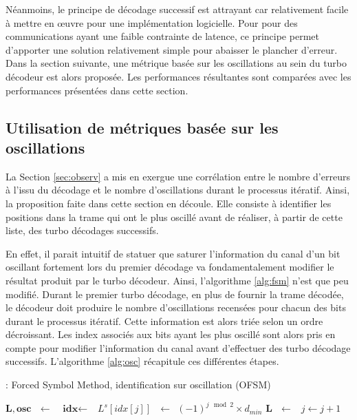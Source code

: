 Néanmoins, le principe de décodage successif est attrayant car relativement facile à mettre en œuvre pour une implémentation logicielle.
Pour pour des communications ayant une faible contrainte de latence, ce principe permet d'apporter une solution relativement
simple pour abaisser le plancher d'erreur. 
Dans la section suivante, une métrique basée sur les oscillations au sein du turbo décodeur est alors proposée. Les performances
résultantes sont comparées avec les performances présentées dans cette section.

\subsection{Utilisation de métriques basée sur les oscillations}
La Section \ref{sec:observ} a mis en exergue une corrélation entre le nombre d'erreurs à l'issu du décodage et 
le nombre d'oscillations durant le processus itératif. Ainsi, la proposition faite dans cette section en découle. Elle 
consiste à identifier les positions dans la trame qui ont le plus oscillé avant de réaliser, à partir de cette liste, des turbo décodages successifs.

En effet, il parait intuitif de statuer que saturer l'information du canal d'un bit oscillant fortement lors du 
premier décodage va fondamentalement modifier le résultat produit par le turbo décodeur. Ainsi, l'algorithme \ref{alg:fsm}
n'est que peu modifié. Durant le premier turbo décodage, en plus de fournir la trame décodée, le décodeur doit produire le 
nombre d'oscillations recensées pour chacun des bits durant le processus itératif. Cette information est alors triée 
selon un ordre décroissant. Les index associés aux bits ayant les plus oscillé sont alors pris en compte pour modifier 
l'information du canal avant d'effectuer des turbo décodage successifs. L'algorithme \ref{alg:osc} récapitule ces différentes 
étapes.
\begin{center}
\begin{minipage}{.9\textwidth}%
\begin{algorithm}[H]
\caption{: Forced Symbol Method, identification sur oscillation (OFSM)}
\label{alg:osc}
\begin{algorithmic}
\State $\mathbf{L, osc} \ \ \ \gets \ \ $
\State $\textbf{idx} \gets  \ \ $
\State {}
	\State $L^s[idx[j]] \ \ \ \gets \ \ (-1)^{j\mod{2}}\times d_{min}$
	\State $\mathbf{L} \ \ \ \gets \ \ $
	\State {}
	\State {}
	\State $j \gets j+1$
\EndWhile
\end{algorithmic}
\end{algorithm}
\end{minipage}
\end{center}

